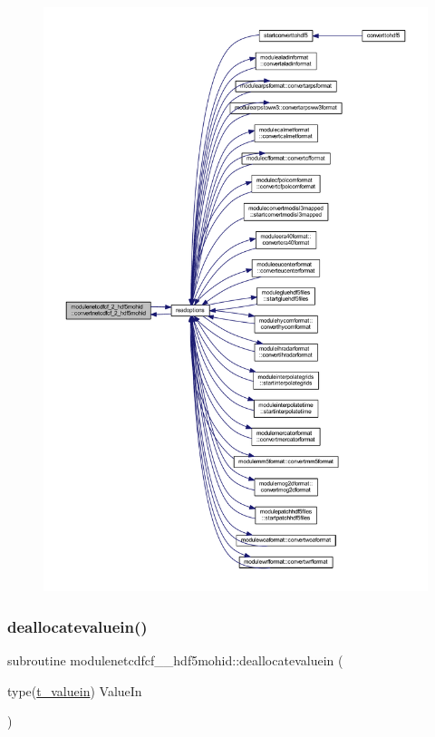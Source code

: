 \begin{figure}[H]
\begin{center}
\leavevmode
\includegraphics[width=350pt]{namespacemodulenetcdfcf__2__hdf5mohid_ad44cbe3d10b2660f418505ecaee704cc_icgraph}
\end{center}
\end{figure}
\mbox{\label{namespacemodulenetcdfcf__2__hdf5mohid_a270019f12c3ed995eab2d0a7dcb103cc}} 
\subsubsection{\texorpdfstring{deallocatevaluein()}{deallocatevaluein()}}
{\footnotesize\ttfamily subroutine modulenetcdfcf\+\_\+\_\+hdf5mohid\+::deallocatevaluein (\begin{DoxyParamCaption}\item[{type(\mbox{\hyperlink{structmodulenetcdfcf__2__hdf5mohid_1_1t__valuein}{t\+\_\+valuein}})}]{Value\+In }\end{DoxyParamCaption})\hspace{0.3cm}{\ttfamily [private]}}

